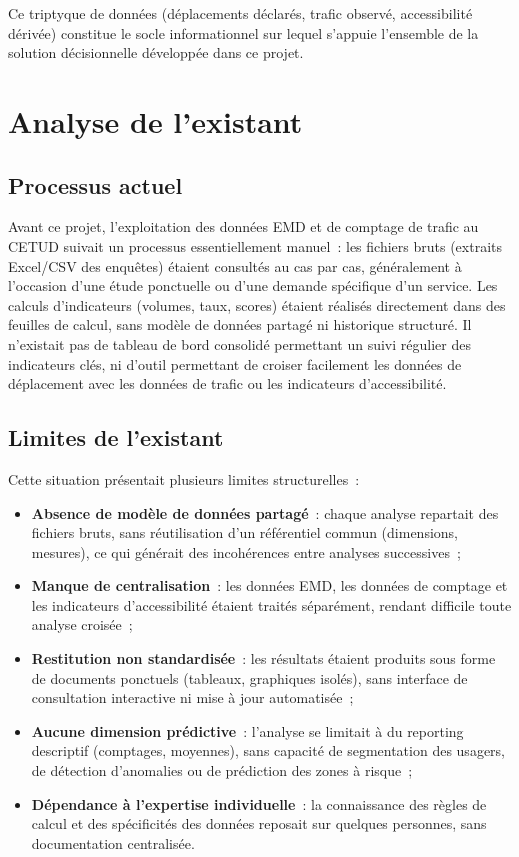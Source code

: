 Ce triptyque de données (déplacements déclarés, trafic observé, accessibilité dérivée) constitue le socle informationnel sur lequel s'appuie l'ensemble de la solution décisionnelle développée dans ce projet.

\section{Analyse de l'existant}

\subsection{Processus actuel}
Avant ce projet, l'exploitation des données EMD et de comptage de trafic au CETUD suivait un processus essentiellement manuel~: les fichiers bruts (extraits Excel/CSV des enquêtes) étaient consultés au cas par cas, généralement à l'occasion d'une étude ponctuelle ou d'une demande spécifique d'un service. Les calculs d'indicateurs (volumes, taux, scores) étaient réalisés directement dans des feuilles de calcul, sans modèle de données partagé ni historique structuré. Il n'existait pas de tableau de bord consolidé permettant un suivi régulier des indicateurs clés, ni d'outil permettant de croiser facilement les données de déplacement avec les données de trafic ou les indicateurs d'accessibilité.

\subsection{Limites de l'existant}
Cette situation présentait plusieurs limites structurelles~:
\begin{itemize}
\item \textbf{Absence de modèle de données partagé}~: chaque analyse repartait des fichiers bruts, sans réutilisation d'un référentiel commun (dimensions, mesures), ce qui générait des incohérences entre analyses successives~;
\item \textbf{Manque de centralisation}~: les données EMD, les données de comptage et les indicateurs d'accessibilité étaient traités séparément, rendant difficile toute analyse croisée~;
\item \textbf{Restitution non standardisée}~: les résultats étaient produits sous forme de documents ponctuels (tableaux, graphiques isolés), sans interface de consultation interactive ni mise à jour automatisée~;
\item \textbf{Aucune dimension prédictive}~: l'analyse se limitait à du reporting descriptif (comptages, moyennes), sans capacité de segmentation des usagers, de détection d'anomalies ou de prédiction des zones à risque~;
\item \textbf{Dépendance à l'expertise individuelle}~: la connaissance des règles de calcul et des spécificités des données reposait sur quelques personnes, sans documentation centralisée.
\end{itemize}

